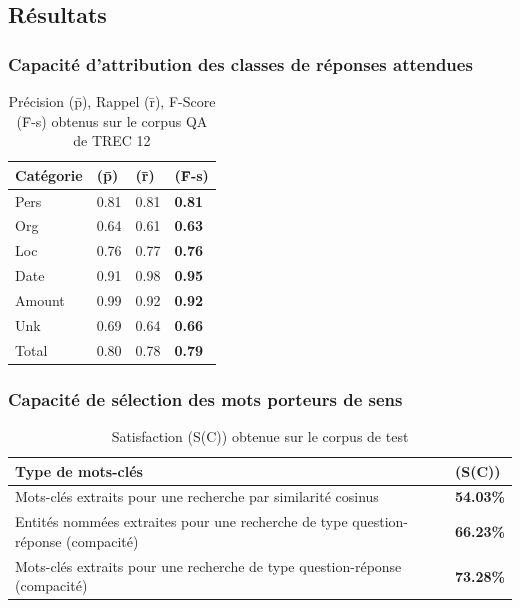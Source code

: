 \documentclass[xcolor=dvipsnames]{beamer}
\begin{document}
\subsection{Résultats}
\frame
{
    \frametitle{Capacité d'attribution des classes de réponses attendues}
    \begin{table}[h]
        \begin{center}
            \begin{tabular}{|p{2.5cm}|l|l|l|}
                \hline
                Catégorie & (\={p}) & (\={r}) & (\={F}-s) \\
                \hline
                Pers & 0.81 & 0.81 & \textbf{0.81} \\
                \hline
                Org & 0.64 & 0.61 & \textbf{0.63} \\
                \hline
                Loc & 0.76 & 0.77 & \textbf{0.76} \\
                \hline
                Date & 0.91 & 0.98 & \textbf{0.95} \\
                \hline
                Amount & 0.99 & 0.92 & \textbf{0.92} \\
                \hline
                Unk & 0.69 & 0.64 & \textbf{0.66} \\
                \hline
                \hline
                Total & 0.80 & 0.78 & \textbf{0.79} \\
                \hline
            \end{tabular}
            \caption{Précision (\={p}), Rappel (\={r}), F-Score (\={F}-s) obtenus sur le corpus QA de TREC 12}
        \end{center}
    \end{table}
}
\frame
{
    \frametitle{Capacité de sélection des mots porteurs de sens}
    \begin{table}[htbp]
        \begin{center}
            \begin{tabular}{|p{8cm}|l|}
                \hline
                Type de mots-clés & (S(C)) \\
                \hline
                Mots-clés extraits pour une recherche par similarité cosinus & \textbf{54.03\%} \\
                \hline
                Entités nommées extraites pour une recherche de type question-réponse (compacité) & \textbf{66.23\%} \\
                \hline
                Mots-clés extraits pour une recherche de type question-réponse (compacité) & \textbf{73.28\%} \\
                \hline
            \end{tabular}
            \caption{Satisfaction (S(C)) obtenue sur le corpus de test}
        \end{center}
    \end{table}
}
\end{document}
